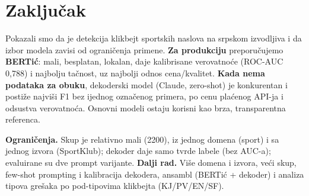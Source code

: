 \documentclass[11pt,a4paper]{article}
\begin{document}
\section{Zaključak}\label{sec:zakljucak}
Pokazali smo da je detekcija klikbejt sportskih naslova na srpskom izvodljiva i da
izbor modela zavisi od ograničenja primene. \textbf{Za produkciju} preporučujemo
\textbf{BERTić}: mali, besplatan, lokalan, daje kalibrisane verovatnoće (ROC-AUC
0{,}788) i najbolju tačnost, uz najbolji odnos cena/kvalitet. \textbf{Kada nema
podataka za obuku}, dekoderski model (Claude, zero-shot) je konkurentan i postiže
najviši F1 bez ijednog označenog primera, po cenu plaćenog API-ja i odsustva
verovatnoća. Osnovni modeli ostaju korisni kao brza, transparentna referenca.

\textbf{Ograničenja.} Skup je relativno mali (2200), iz jednog domena (sport) i sa
jednog izvora (SportKlub); dekoder daje samo tvrde labele (bez AUC-a); evaluirane su
dve prompt varijante. \textbf{Dalji rad.} Više domena i izvora, veći skup, few-shot
prompting i kalibracija dekodera, ansambl (BERTić + dekoder) i analiza tipova grešaka
po pod-tipovima klikbejta (KJ/PV/EN/SF).



\end{document}
